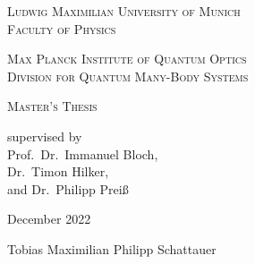 \begin{titlepage}
    \vspace*{\fill}
    \centering

    \textsc{\Large Ludwig Maximilian University of Munich}\\
    \textsc{Faculty of Physics}

    \vspace{1cm}

    \textsc{\Large Max Planck Institute of Quantum Optics}\\
    \textsc{Division for Quantum Many-Body Systems}

    \vspace{2.5cm}

    \begin{doublespace}
        \makeatletter
        \textsc{ \Huge \@title}
        \makeatother
    \end{doublespace}


    \vspace{2.5cm}
    \huge \textsc{Master's Thesis}



    \vspace{0.3cm}
    \large \textrm{supervised by\\Prof.~Dr.~Immanuel Bloch,\\Dr.~Timon Hilker,\\and Dr.~Philipp Preiß}

    \vspace{1.5cm}
    \huge
    \textrm{December 2022}

    \vspace{1.5cm}
    \Large \textrm{Tobias Maximilian Philipp Schattauer}

    \vspace*{\fill}
\end{titlepage}







